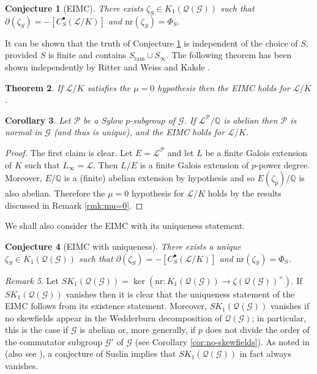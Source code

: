 \documentclass[12pt]{amsart}
\theoremstyle{plain}
\newtheorem{theorem}{Theorem}[section]
\newtheorem{corollary}[theorem]{Corollary}
\newtheorem{conj}[theorem]{Conjecture}
\theoremstyle{remark}
\newtheorem{remark}[theorem]{Remark}
\theoremstyle{definition}
\numberwithin{equation}{section}
\begin{document}
\begin{conj}[EIMC]\label{conj:EIMC}
There exists $\zeta_{S} \in K_{1}(\mathcal{Q}(\mathcal{G}))$ such that $\partial(\zeta_{S}) = -[C_{S}^{\bullet}(\mathcal{L}/K)]$
and ${\mathrm{nr}}(\zeta_{S}) = \Phi_{S}$.
\end{conj}

It can be shown that the truth of Conjecture \ref{conj:EIMC} is independent of the choice of $S$, 
provided $S$ is finite and contains $S_{\mathrm{ram}} \cup S_{\infty}$.
The following theorem has been shown independently by Ritter and Weiss \cite{MR2813337} and Kakde \cite{MR3091976}.

\begin{theorem}\label{thm:EIMC-with-mu}
If $\mathcal{L}/K$ satisfies the $\mu=0$ hypothesis then the EIMC holds for $\mathcal{L}/K$.
\end{theorem}

\begin{corollary}\label{cor:EIMC-unconditional}
Let $\mathcal{P}$ be a Sylow $p$-subgroup of $\mathcal{G}$.
If $\mathcal{L}^{\mathcal{P}}/{\mathbb{Q}}$ is abelian then $\mathcal{P}$ is normal in $\mathcal{G}$ (and thus is unique),
and the EIMC holds for $\mathcal{L}/K$.
\end{corollary}

\begin{proof}
The first claim is clear.
Let $E=\mathcal{L}^{\mathcal{P}}$ and let $L$ be a finite Galois extension of $K$ such that $L_{\infty}=\mathcal{L}$.
Then $L/E$ is a finite Galois extension of $p$-power degree.
Moreover, $E/{\mathbb{Q}}$ is a (finite) abelian extension by hypothesis and so $E(\zeta_{p})/{\mathbb{Q}}$ is also abelian.
Therefore the $\mu=0$ hypothesis for $\mathcal{L}/K$ holds by the results discussed in Remark \ref{rmk:mu=0}.
\end{proof}

We shall also consider the EIMC with its uniqueness statement.

\begin{conj}[EIMC with uniqueness]\label{conj:EIMC-unique}
There exists a unique $\zeta_{S} \in K_{1}(\mathcal{Q}(\mathcal{G}))$ such that $\partial(\zeta_{S}) = -[C_{S}^{\bullet}(\mathcal{L}/K)]$
and ${\mathrm{nr}}(\zeta_{S}) = \Phi_{S}$.
\end{conj}

\begin{remark}\label{rmk:SK1}
Let $SK_{1}(\mathcal{Q}(\mathcal{G})) = \ker({\mathrm{nr}}: K_{1}(\mathcal{Q}(\mathcal{G})) \longrightarrow \zeta(\mathcal{Q}(\mathcal{G}))^{\times})$.
If $SK_{1}(\mathcal{Q}(\mathcal{G}))$ vanishes then it is clear that the uniqueness statement of the EIMC follows from
its existence statement.
Moreover, $SK_{1}(\mathcal{Q}(\mathcal{G}))$ vanishes if no skewfields appear in the Wedderburn decomposition of
$\mathcal{Q}(\mathcal{G})$; in particular, this is the case if $\mathcal{G}$ is abelian or, more generally, if $p$ does not
divide the order of the commutator subgroup $\mathcal{G}'$ of $\mathcal{G}$ (see Corollary \ref{cor:no-skewfields}).
As noted in \cite[Remark E]{MR2114937} (also see \cite[Remark 3.5]{burns-mc}), a conjecture of Suslin implies that $SK_{1}(\mathcal{Q}(\mathcal{G}))$ in fact always vanishes.
\end{remark}
\end{document}
